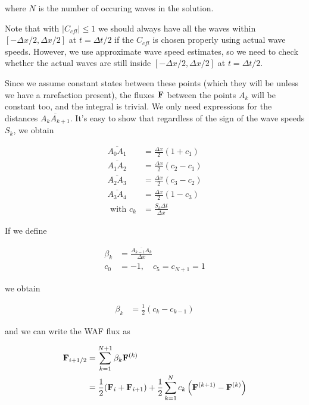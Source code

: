 where $N$ is the number of occuring waves in the solution.





Note that with $|C_{cfl}| \leq 1$ we should always have all the waves within $[-\Delta x /2, \Delta x / 2]$ at $t = \Delta t / 2$ if the $C_{cfl}$ is chosen properly using actual wave speeds.
However, we use approximate wave speed estimates, so we need to check whether the actual waves are still inside $[-\Delta x /2, \Delta x / 2]$ at $t = \Delta t / 2$.



Since we assume constant states between these points (which they will be unless we have a rarefaction present), the fluxes $\mathbf{F}$ between the points $A_k$ will be constant too, and the integral is trivial.
We only need expressions for the distances $\overline{A_{k}A_{k+1}}$.
It's easy to show that regardless of the sign of the wave speeds $S_k$, we obtain

\begin{align*}
	\overline{A_0 A_1} &= 
		\frac{\Delta x}{2} ( 1 + c_1 ) \\
	\overline{A_1 A_2} &= 
		\frac{\Delta x}{2} ( c_2 - c_1 ) \\
	\overline{A_2 A_3} &= 
		\frac{\Delta x}{2} ( c_3 - c_2 ) \\
	\overline{A_3 A_4} &= 
		\frac{\Delta x}{2} ( 1 - c_3 ) \\ 
	\text{ with } c_k &= \frac{S_k \Delta t}{\Delta x}
\end{align*}



If we define

\begin{align*}
	\beta_k &= \frac{\overline{A_{k-1} A_k}}{\Delta x}\\
	c_0 &= -1, \quad c_5 = c_{N+1} = 1
\end{align*}

we obtain

\begin{align*}
	\beta_k &= \frac{1}{2} (c_k - c_{k-1})
\end{align*}

and we can write the WAF flux as

\begin{align}
	\F_{i + \half} 
		&= \sum\limits_{k = 1}^{N+1} \beta_k \F^{(k)} \\
		&= \frac{1}{2} (\F_i + \F_{i+1}) + \frac{1}{2} \sum\limits_{k = 1}^{N} c_k \left (\F^{(k+1)} - \F^{(k)} \right) 
\end{align}




